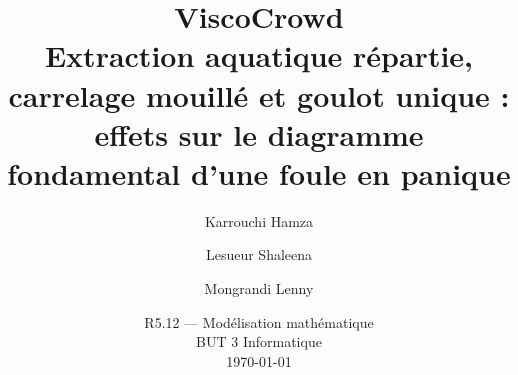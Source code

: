 \documentclass[11pt,a4paper]{article}
\title{%
    \vspace{-1.5cm}
    \textbf{ViscoCrowd}\\[0.3cm]
    \large Extraction aquatique répartie, carrelage mouillé et goulot unique :\\
    effets sur le diagramme fondamental d'une foule en panique
}
\author{%
    Karrouchi Hamza \and Lesueur Shaleena \and Mongrandi Lenny
}
\date{R5.12 — Modélisation mathématique \\ BUT 3 Informatique \\ \today}
\begin{document}
\maketitle

\begin{abstract}

\end{abstract}

\tableofcontents
\newpage












\clearpage
\appendix



\end{document}
